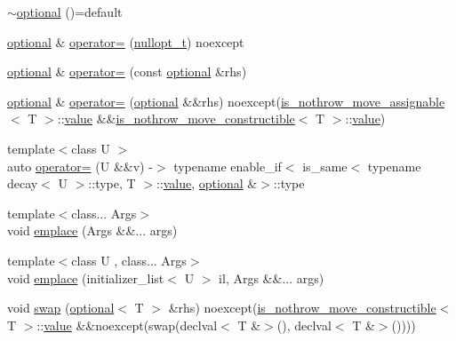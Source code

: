 \begin{DoxyCompactItemize}
\item 
\hyperlink{classstd_1_1experimental_1_1optional_a6a0db9c777d56ec7b35fa86811d0d971}{$\sim$optional} ()=default
\item 
\hyperlink{classstd_1_1experimental_1_1optional}{optional} \& \hyperlink{classstd_1_1experimental_1_1optional_a18ebe94413663ea3b18d9e8d98fbc9af}{operator=} (\hyperlink{structstd_1_1experimental_1_1nullopt__t}{nullopt\+\_\+t}) noexcept
\item 
\hyperlink{classstd_1_1experimental_1_1optional}{optional} \& \hyperlink{classstd_1_1experimental_1_1optional_a79fc2baa94eb20e81898e351edbe984f}{operator=} (const \hyperlink{classstd_1_1experimental_1_1optional}{optional} \&rhs)
\item 
\hyperlink{classstd_1_1experimental_1_1optional}{optional} \& \hyperlink{classstd_1_1experimental_1_1optional_a458e0eb811fd30159370230cb977ab7a}{operator=} (\hyperlink{classstd_1_1experimental_1_1optional}{optional} \&\&rhs) noexcept(\hyperlink{structstd_1_1experimental_1_1is__nothrow__move__assignable}{is\+\_\+nothrow\+\_\+move\+\_\+assignable}$<$ T $>$\+::\hyperlink{classstd_1_1experimental_1_1optional_ad1277f09c288255dfe102b72e7107be6}{value} \&\&\hyperlink{structstd_1_1experimental_1_1is__nothrow__move__constructible}{is\+\_\+nothrow\+\_\+move\+\_\+constructible}$<$ T $>$\+::\hyperlink{classstd_1_1experimental_1_1optional_ad1277f09c288255dfe102b72e7107be6}{value})
\item 
{\footnotesize template$<$class U $>$ }\\auto \hyperlink{classstd_1_1experimental_1_1optional_a7234fc6703bf072bef7abd51ae6ea81f}{operator=} (U \&\&v) -\/$>$ typename enable\+\_\+if$<$ is\+\_\+same$<$ typename decay$<$ U $>$\+::type, T $>$\+::\hyperlink{classstd_1_1experimental_1_1optional_ad1277f09c288255dfe102b72e7107be6}{value}, \hyperlink{classstd_1_1experimental_1_1optional}{optional} \&$>$\+::type
\item 
{\footnotesize template$<$class... Args$>$ }\\void \hyperlink{classstd_1_1experimental_1_1optional_a6b60e8fad8acbead730a4eb9a8c3b80c}{emplace} (Args \&\&... args)
\item 
{\footnotesize template$<$class U , class... Args$>$ }\\void \hyperlink{classstd_1_1experimental_1_1optional_a1c2ef21da5656cd5c94cafbb0997736b}{emplace} (initializer\+\_\+list$<$ U $>$ il, Args \&\&... args)
\item 
void \hyperlink{classstd_1_1experimental_1_1optional_ad1173a269b43cd9ed55930c3eed0a4dd}{swap} (\hyperlink{classstd_1_1experimental_1_1optional}{optional}$<$ T $>$ \&rhs) noexcept(\hyperlink{structstd_1_1experimental_1_1is__nothrow__move__constructible}{is\+\_\+nothrow\+\_\+move\+\_\+constructible}$<$ T $>$\+::\hyperlink{classstd_1_1experimental_1_1optional_ad1277f09c288255dfe102b72e7107be6}{value} \&\&noexcept(swap(declval$<$ T \&$>$(), declval$<$ T \&$>$())))

\end{DoxyCompactItemize}
